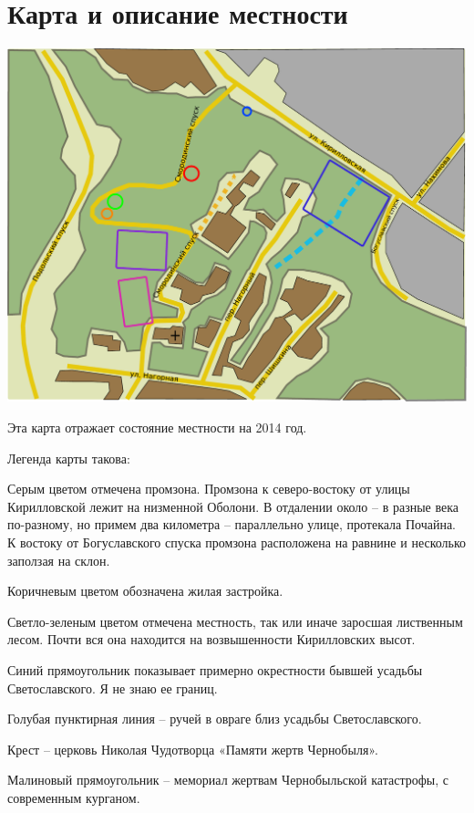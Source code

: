 \chapter{Карта и описание местности}

\begin{center}
\includegraphics[width=\linewidth]{chast-zmiy/karta-opis/smor-map-2014.pdf}
\end{center}

Эта карта отражает состояние местности на 2014 год.

Легенда карты такова:

Серым цветом отмечена промзона. Промзона к северо-востоку от улицы Кирилловской лежит на низменной Оболони. В отдалении около – в разные века по-разному, но примем два километра – параллельно улице, протекала Почайна. К востоку от Богуславского спуска промзона расположена на равнине и несколько заползая на склон.

Коричневым цветом обозначена жилая застройка.

Светло-зеленым цветом отмечена местность, так или иначе заросшая лиственным лесом. Почти вся она находится на возвышенности Кирилловских высот.

Синий прямоугольник показывает примерно окрестности бывшей усадьбы Светославского. Я не знаю ее границ.

Голубая пунктирная линия – ручей в овраге близ усадьбы Светославского.

Крест – церковь Николая Чудотворца «Памяти жертв Чернобыля».

Малиновый прямоугольник – мемориал жертвам Чернобыльской катастрофы, с современным курганом.

